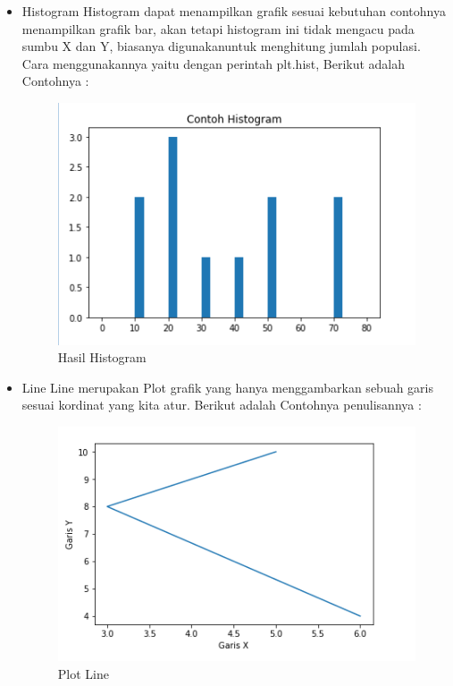 \begin{itemize} 
    \item Histogram\newline
    Histogram dapat menampilkan grafik sesuai kebutuhan contohnya menampilkan grafik bar, akan tetapi histogram ini
    tidak mengacu pada sumbu X dan Y, biasanya digunakanuntuk menghitung jumlah populasi.\newline
    Cara menggunakannya yaitu dengan perintah plt.hist, Berikut adalah Contohnya :

    

\begin{figure}[h]
\centering
\includegraphics[scale=0.9]{figures/6/Teori/1174051/3.png}
\caption{Hasil Histogram}
\label{fig:contoh}
\end{figure}
\end{itemize}

\begin{itemize}
    \item Line\newline
    Line merupakan Plot grafik yang hanya menggambarkan sebuah garis sesuai kordinat yang kita atur.
    Berikut adalah Contohnya penulisannya :

    

\begin{figure}[h]
\centering
\includegraphics[scale=0.6]{figures/6/Teori/1174051/1.png}
\caption{Plot Line}
\label{fig:contoh}
\end{figure}
\end{itemize}

